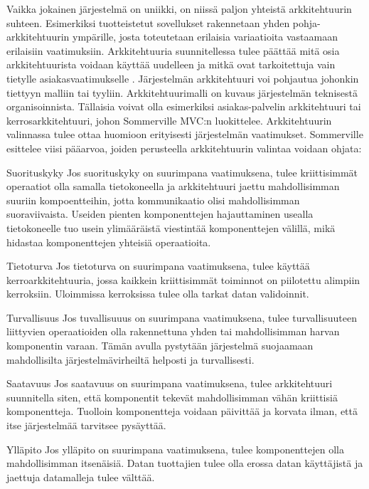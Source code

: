 \documentclass[utf8]{gradu3}
\begin{document}
Vaikka jokainen järjestelmä on uniikki, on niissä paljon yhteistä arkkitehtuurin suhteen. Esimerkiksi tuotteistetut sovellukset rakennetaan yhden pohja-arkkitehtuurin ympärille, josta toteutetaan erilaisia variaatioita vastaamaan erilaisiin vaatimuksiin. Arkkitehtuuria suunnitellessa tulee päättää mitä osia arkkitehtuurista voidaan käyttää uudelleen ja mitkä ovat tarkoitettuja vain tietylle asiakasvaatimukselle \parencite[s. 151]{Sommerville}. Järjestelmän arkkitehtuuri voi pohjautua johonkin tiettyyn malliin tai tyyliin. Arkkitehtuurimalli on kuvaus järjestelmän teknisestä organisoinnista. Tällaisia voivat olla esimerkiksi asiakas-palvelin arkkitehtuuri tai kerrosarkkitehtuuri, johon Sommerville MVC:n luokittelee. Arkkitehtuurin valinnassa tulee ottaa huomioon erityisesti järjestelmän vaatimukset. Sommerville \parencite[s.152]{Sommerville} esittelee viisi pääarvoa, joiden perusteella arkkitehtuurin valintaa voidaan ohjata:

\begin{desclist}
\item[Suorituskyky] Jos suorituskyky on suurimpana vaatimuksena, tulee kriittisimmät operaatiot olla samalla tietokoneella ja arkkitehtuuri jaettu mahdollisimman suuriin kompoentteihin, jotta kommunikaatio olisi mahdollisimman suoraviivaista. Useiden pienten komponenttejen hajauttaminen usealla tietokoneelle tuo usein ylimääräistä viestintää komponenttejen välillä, mikä hidastaa komponenttejen yhteisiä operaatioita. 
\item[Tietoturva] Jos tietoturva on suurimpana vaatimuksena, tulee käyttää kerroarkkitehtuuria, jossa kaikkein kriittisimmät toiminnot on piilotettu alimpiin kerroksiin. Uloimmissa kerroksissa tulee olla tarkat datan validoinnit. 
\item[Turvallisuus] Jos tuvallisuuus on suurimpana vaatimuksena, tulee turvallisuuteen liittyvien operaatioiden olla rakennettuna yhden tai mahdollisimman harvan komponentin varaan. Tämän avulla pystytään järjestelmä suojaamaan mahdollisilta järjestelmävirheiltä helposti ja turvallisesti.
\item[Saatavuus] Jos saatavuus on suurimpana vaatimuksena, tulee arkkitehtuuri suunnitella siten, että komponentit tekevät mahdollisimman vähän kriittisiä komponentteja. Tuolloin komponentteja voidaan päivittää ja korvata ilman, että itse järjestelmää tarvitsee pysäyttää. 
\item[Ylläpito] Jos ylläpito on suurimpana vaatimuksena, tulee komponenttejen olla mahdollisimman itsenäisiä. Datan tuottajien tulee olla erossa datan käyttäjistä ja jaettuja datamalleja tulee välttää.
\end{desclist}
\end{document}
